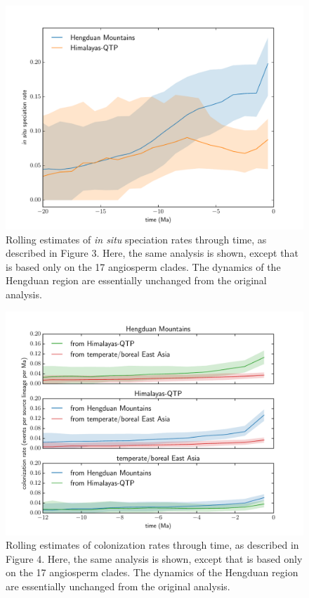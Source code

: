 \begin{figure}
\centering
\includegraphics[width=.99\linewidth]{figures/speciation-rates-angiosperms.pdf}
\caption{Rolling estimates of \textit{in situ} speciation rates
  through time, as described in Figure 3. Here, the same analysis is
  shown, except that is based only on the 17 angiosperm clades. The
  dynamics of the Hengduan region are essentially unchanged from the
  original analysis.}
\label{fig:speciation:angios}
\end{figure}

\begin{figure}
\centering
\includegraphics[width=.99\linewidth]{figures/dispersal-rates-angiosperms.pdf}
\caption{Rolling estimates of colonization rates through time, as
  described in Figure 4. Here, the same analysis is shown, except that
  is based only on the 17 angiosperm clades. The dynamics of the
  Hengduan region are essentially unchanged from the original
  analysis.}
\label{fig:dispersal:angios}
\end{figure}

